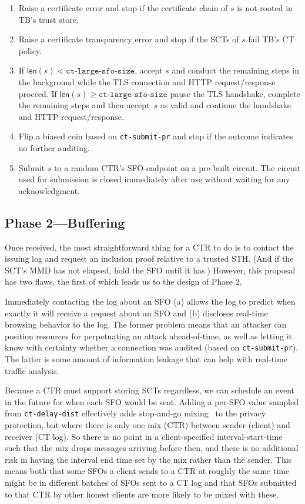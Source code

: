 \begin{enumerate}
    \item Raise a certificate error and stop if the certificate chain of $s$
        is not rooted in TB's trust store.
    \item Raise a certificate transparency error and stop if the SCTs of $s$
        fail TB's CT policy.
    \item If $\mathsf{len}(s) < \texttt{ct-large-sfo-size}$, accept $s$ and
        conduct the remaining steps in the background while the TLS connection
        and HTTP request/response proceed. If $\mathsf{len}(s) \geq
        \texttt{ct-large-sfo-size}$ pause the TLS handshake, complete the
        remaining steps and then accept~$s$ as valid and continue the handshake
        and HTTP request/response.
    \item Flip a biased coin based on \texttt{ct-submit-pr} and stop if the
        outcome indicates no further auditing.
    \item Submit $s$ to a random CTR's SFO-endpoint on a pre-built circuit.
        The circuit used for submission is closed immediately after use without
        waiting for any acknowledgment.
\end{enumerate}

\subsection{Phase 2---Buffering} \label{sec:base:phase2}

Once received, the most straightforward thing for a CTR to do is to contact the
issuing log and request an inclusion proof relative to a trusted STH\@. (And if
the SCT's MMD has not elapsed, hold the SFO until it has.) However, this
proposal has two flaws, the first of which leads us to the design of Phase 2.

Immediately contacting the log about an SFO (a) allows the log to predict when
exactly it will receive a request about an SFO and (b) discloses real-time
browsing behavior to the log. The former problem means that an attacker can
position resources for perpetuating an attack ahead-of-time, as well as letting
it know with certainty whether a connection was audited (based on
\texttt{ct-submit-pr}). The latter is some amount of information leakage that
can help with real-time traffic analysis. 

Because a CTR must support storing SCTs regardless, we can schedule an event in
the future for when each SFO would be sent. Adding a per-SFO value sampled from
\texttt{ct-delay-dist} effectively adds stop-and-go
mixing~\cite{kesdogan:ih1998} to the privacy protection, but where there is only
one mix (CTR) between sender (client) and receiver (CT log). So there is no
point in a client-specified interval-start-time such that the mix drops messages
arriving before then, and there is no additional risk in having the interval end
time set by the mix rather than the sender. This means both that some SFOs a
client sends to a CTR at roughly the same time might be in different batches of
SFOs sent to a CT log and that SFOs submitted to that CTR by other honest
clients are more likely to be mixed with these.


